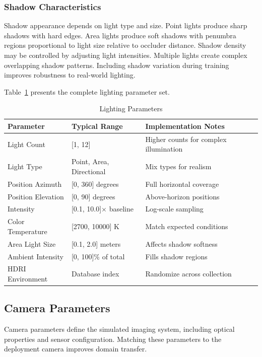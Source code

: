 \subsubsection{Shadow Characteristics}

Shadow appearance depends on light type and size. Point lights produce sharp shadows with hard edges. Area lights produce soft shadows with penumbra regions proportional to light size relative to occluder distance. Shadow density may be controlled by adjusting light intensities. Multiple lights create complex overlapping shadow patterns. Including shadow variation during training improves robustness to real-world lighting.

Table~\ref{tab:lighting_params} presents the complete lighting parameter set.

\begin{table}[htbp]
\centering
\caption{Lighting Parameters}
\label{tab:lighting_params}
\begin{tabular}{p{3.5cm}p{3cm}p{5cm}}
\hline
\textbf{Parameter} & \textbf{Typical Range} & \textbf{Implementation Notes} \\
\hline
Light Count & [1, 12] & Higher counts for complex illumination \\
Light Type & Point, Area, Directional & Mix types for realism \\
Position Azimuth & [0, 360] degrees & Full horizontal coverage \\
Position Elevation & [0, 90] degrees & Above-horizon positions \\
Intensity & [0.1, 10.0]$\times$ baseline & Log-scale sampling \\
Color Temperature & [2700, 10000] K & Match expected conditions \\
Area Light Size & [0.1, 2.0] meters & Affects shadow softness \\
Ambient Intensity & [0, 100]\% of total & Fills shadow regions \\
HDRI Environment & Database index & Randomize across collection \\
\hline
\end{tabular}
\end{table}

\subsection{Camera Parameters}

Camera parameters define the simulated imaging system, including optical properties and sensor configuration. Matching these parameters to the deployment camera improves domain transfer.

